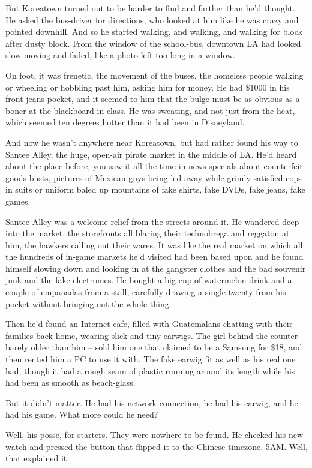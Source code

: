 But Koreatown turned out to be harder to find and farther than he'd
thought. He asked the bus-driver for directions, who looked at him
like he was crazy and pointed downhill. And so he started walking,
and walking, and walking for block after dusty block. From the
window of the school-bus, downtown LA had looked slow-moving and
faded, like a photo left too long in a window.

On foot, it was frenetic, the movement of the buses, the homeless
people walking or wheeling or hobbling past him, asking him for
money. He had \$1000 in his front jeans pocket, and it seemed to
him that the bulge must be as obvious as a boner at the blackboard
in class. He was sweating, and not just from the heat, which seemed
ten degrees hotter than it had been in Disneyland.

And now he wasn't anywhere near Koreatown, but had rather found his
way to Santee Alley, the huge, open-air pirate market in the middle
of LA. He'd heard about the place before, you saw it all the time
in news-specials about counterfeit goods busts, pictures of Mexican
guys being led away while grimly satisfied cops in suits or uniform
baled up mountains of fake shirts, fake DVDs, fake jeans, fake
games.

Santee Alley was a welcome relief from the streets around it. He
wandered deep into the market, the storefronts all blaring their
technobrega and reggaton at him, the hawkers calling out their
wares. It was like the real market on which all the hundreds of
in-game markets he'd visited had been based upon and he found
himself slowing down and looking in at the gangster clothes and the
bad souvenir junk and the fake electronics. He bought a big cup of
watermelon drink and a couple of empanadas from a stall, carefully
drawing a single twenty from his pocket without bringing out the
whole thing.

Then he'd found an Internet cafe, filled with Guatemalans chatting
with their families back home, wearing slick and tiny earwigs. The
girl behind the counter -- barely older than him -- sold him one
that claimed to be a Samsung for \$18, and then rented him a PC to
use it with. The fake earwig fit as well as his real one had,
though it had a rough seam of plastic running around its length
while his had been as smooth as beach-glass.

But it didn't matter. He had his network connection, he had his
earwig, and he had his game. What more could he need?

Well, his posse, for starters. They were nowhere to be found. He
checked his new watch and pressed the button that flipped it to the
Chinese timezone. 5AM. Well, that explained it.


